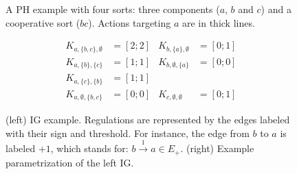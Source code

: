 \begin{figure}[h]
{
}

\caption{\label{fig:runningPH}
A PH example with four sorts: three components ($a$, $b$ and $c$) and a cooperative sort ($bc$).
Actions targeting $a$ are in thick lines.
}
\end{figure}

\begin{figure}[h]
\begin{minipage}{0.4\linewidth}
\centering
{}
\end{minipage}
\begin{minipage}{0.6\linewidth}
\centering
\begin{align*}
K_{a,\{b,c\},\emptyset} &= [2 ; 2] & K_{b,\{a\},\emptyset} &= [0 ; 1] \\
K_{a,\{b\},\{c\}} &= [1 ; 1] & K_{b,\emptyset,\{a\}} &= [0 ; 0] \\
K_{a,\{c\},\{b\}} &= [1 ; 1] &&\\
K_{a,\emptyset,\{b,c\}} &= [0 ; 0] & K_{c,\emptyset,\emptyset} &= [0 ; 1]
\end{align*}
\end{minipage}
\caption{\label{fig:runningBRN}
(left)
IG example.
Regulations are represented by the edges labeled with their sign and threshold.
For instance, the edge from $b$ to $a$ is labeled $+1$, which stands for: $b \xrightarrow{1} a \in
E_+$.
(right)
Example parametrization of the left IG.
}
\end{figure}
